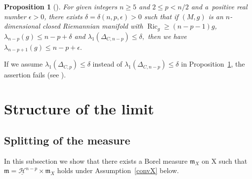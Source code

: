 \documentclass[pdftex]{sigma}
\numberwithin{equation}{section}
\newtheorem{Thm}{Theorem}[section]
\newtheorem{Prop}[Thm]{Proposition}
\theoremstyle{definition}
\newcommand{\Ric}{\operatorname{Ric}}
\newcommand{\mf}{\mathfrak{m}}
\newcommand{\nHa}{\underline{\mathcal{H}}}
\begin{document}
\begin{Prop}[{\cite[Corollary~4.53]{Ai3}}]\label{impr}
For given integers $n\geq 5$ and $2\leq p < n/2$ and a~positive real number $\epsilon>0$, there exists $\delta=\delta(n,p,\epsilon)>0$ such that if $(M,g)$ is an $n$-dimensional closed Riemannian manifold with $\Ric_g\geq (n-p-1)g$,
$\lambda_{n-p}(g)\leq n-p+\delta$
and
$\lambda_1(\Delta_{C,n-p})\leq \delta,$
then we have
$
\lambda_{n-p+1}(g)\leq n-p+\epsilon.
$
\end{Prop}
If we assume $\lambda_1(\Delta_{C,p})\leq \delta$ instead of $\lambda_1(\Delta_{C,n-p})\leq \delta$ in Proposition~\ref{impr}, the assertion fails (see \cite[Corollary~3.2 and~Proposition~3.3]{Ai3}).

\section{Structure of the limit}
\subsection{Splitting of the measure}
In this subsection we show that there exists a Borel measure $\mf_X$ on X such that $\mf=\nHa^{n-p}\times \mf_X$ holds under Assumption~\ref{convX} below.
\end{document}
